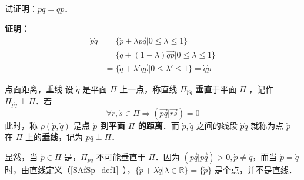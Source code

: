 \begin{example}{}
试证明：$\dot p\dot q=\dot q\dot p$．

\textbf{证明：}
\begin{equation}
\begin{aligned}
\dot p\dot q&=\{\dot p+\lambda\overrightarrow{pq}|0\leq\lambda\leq1\}\\
&=\{\dot q+(1-\lambda)\overrightarrow{qp}|0\leq\lambda\leq1\}\\
&=\{\dot q+\lambda'\overrightarrow{qp}|0\leq\lambda'\leq1\}=\dot q\dot p
\end{aligned}
\end{equation}
\end{example}
\begin{definition}{点面距离，垂线}
设 $\dot q$ 是平面 $\Pi$ 上一点，称直线 $\Pi_{\dot p\dot q}$ \textbf{垂直}于平面 $\Pi$ ，记作 $\Pi_{\dot p\dot q}\perp\Pi$．若
\begin{equation}
\forall \dot r,\dot s\in\Pi\Rightarrow (\overrightarrow{pq}|\overrightarrow{rs})=0
\end{equation}
此时，称 $\rho(\dot p,\dot q)$ 是\textbf{点 $\dot p$ 到平面 $\Pi$ 的距离}．而 $\dot p,\dot q$ 之间的线段 $\dot p\dot q$ 就称为点 $\dot p$ 在 $\Pi$ 上的\textbf{垂线}，记为 $\dot p\dot q\perp\Pi$．
\end{definition}
显然，当 $\dot p\in\Pi$ 是，$\Pi_{\dot p\dot q}$ 不可能垂直于 $\Pi$．因为 $(\overrightarrow{pq}|\overrightarrow{pq})>0,\dot p\neq \dot q$，而当 $\dot p=\dot q$ 时，由直线定义（\autoref{SAfSp_def1}~），$\{\dot p+\lambda\dot q|\lambda\in \mathbb R\}=\{\dot p\}$ 是个点，并不是直线．